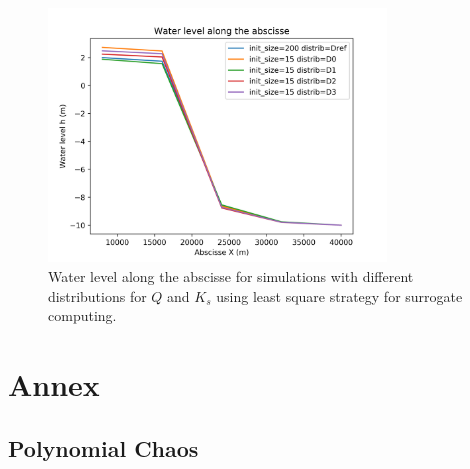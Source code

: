 \documentclass[hidelinks,12pt]{article}
\begin{document}
\begin{figure}
  \centering
  \includegraphics[width=0.8\textwidth]{images/influence_distributions_least_square.png}
  \caption{Water level along the abscisse for simulations with different distributions for $Q$ and $K_s$ using least square strategy for surrogate computing.}
  	\label{influence_distributions_least_square}
\end{figure}




\section{Annex}

\subsection{Polynomial Chaos}

\subsection{}
\end{document}
